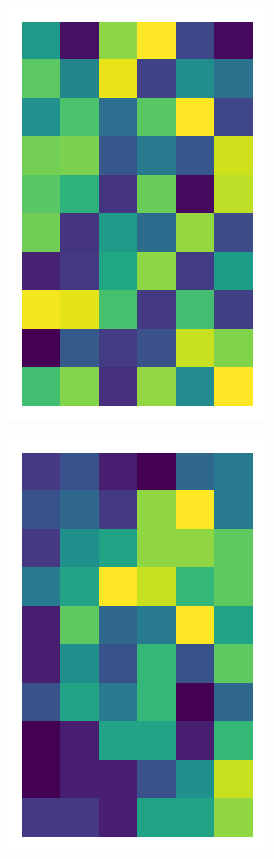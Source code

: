 \documentclass[10pt,twocolumn]{article}
\begin{document}
\begin{figure}[H]
\begin{subfigure}[t]{.15\textwidth}
\centering
\includegraphics[scale=.2]{random-matrix-original.png}
\caption{ }
\end{subfigure}
\begin{subfigure}[t]{.15\textwidth}
\centering
\includegraphics[scale=.2]{semi-structured-matrix-original.png}
\caption{ }
\end{subfigure}
\begin{subfigure}[t]{.15\textwidth}
\centering

\end{subfigure}
\end{figure}
\end{document}
